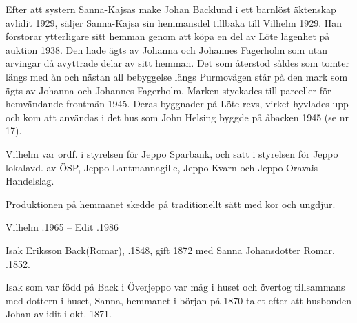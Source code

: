 Efter att systern Sanna-Kajsas make Johan Backlund i ett barnlöst äktenskap avlidit 1929, säljer Sanna-Kajsa sin hemmansdel tillbaka till Vilhelm 1929. Han förstorar ytterligare sitt hemman genom att köpa en del av Löte lägenhet på auktion 1938. Den hade ägts av Johanna och Johannes Fagerholm som utan arvingar då  avyttrade  delar av sitt hemman. Det som återstod såldes som tomter längs med ån och nästan all bebyggelse längs Purmovägen står på den mark som ägts av Johanna och Johannes Fagerholm. Marken styckades till parceller för hemvändande frontmän 1945. Deras byggnader på Löte revs, virket hyvlades upp och kom att användas i det hus som John Helsing byggde på åbacken 1945 (se nr 17).

Vilhelm var ordf. i styrelsen för Jeppo Sparbank, och satt i styrelsen för Jeppo lokalavd. av ÖSP, Jeppo Lantmannagille, Jeppo Kvarn och
Jeppo-Oravais Handelslag.
\begin{jhchildren}
  \item {}
  \item {}
  \item {}
  \item {}
\end{jhchildren}

Produktionen på hemmanet skedde på traditionellt sätt med kor och ungdjur.

Vilhelm .1965  --  Edit .1986



Isak Eriksson Back(Romar), .1848, gift 1872 med Sanna Johansdotter Romar, .1852.
\begin{jhchildren}
  \item {}
  \item {}
  \item {}
  \item {}
  \item {}
  \item {}
  \item {}
\end{jhchildren}

Isak som var född på Back i Överjeppo var måg i huset och övertog tillsammans med dottern i huset, Sanna, hemmanet i början på 1870-talet efter att husbonden Johan avlidit i okt. 1871.


